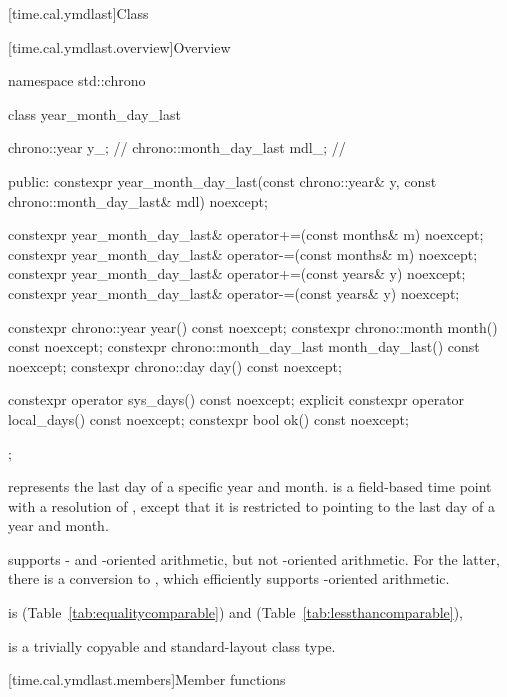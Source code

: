 [time.cal.ymdlast]{Class }

[time.cal.ymdlast.overview]{Overview}

\begin{codeblock}
namespace std::chrono {
  class year_month_day_last {
    chrono::year           y_;          // \expos
    chrono::month_day_last mdl_;        // \expos

  public:
    constexpr year_month_day_last(const chrono::year& y,
                                  const chrono::month_day_last& mdl) noexcept;

    constexpr year_month_day_last& operator+=(const months& m) noexcept;
    constexpr year_month_day_last& operator-=(const months& m) noexcept;
    constexpr year_month_day_last& operator+=(const years& y)  noexcept;
    constexpr year_month_day_last& operator-=(const years& y)  noexcept;

    constexpr chrono::year           year()           const noexcept;
    constexpr chrono::month          month()          const noexcept;
    constexpr chrono::month_day_last month_day_last() const noexcept;
    constexpr chrono::day            day()            const noexcept;

    constexpr          operator sys_days()   const noexcept;
    explicit constexpr operator local_days() const noexcept;
    constexpr bool ok() const noexcept;
  };
}
\end{codeblock}

\pnum
{} represents the last day of a specific year and month.
 is a field-based time point with a resolution of ,
except that it is restricted to pointing to the last day of a year and month.
\begin{note}
 supports - and -oriented arithmetic,
but not -oriented arithmetic.
For the latter, there is a conversion to ,
which efficiently supports -oriented arithmetic.
\end{note}
 is  (Table~\ref{tab:equalitycomparable})
and  (Table~\ref{tab:lessthancomparable}),

\pnum
{} is a trivially copyable and standard-layout class type.

[time.cal.ymdlast.members]{Member functions}

